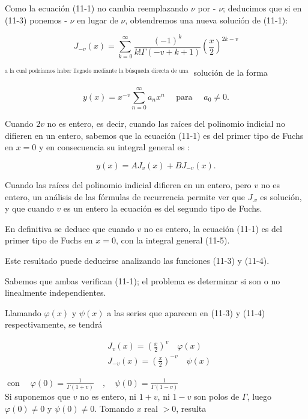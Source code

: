 \documentclass[10pt]{article}
\theoremstyle{plain}
\theoremstyle{definition}
\theoremstyle{remark}
\begin{document}
Como la ecuación (11-1) no cambia reemplazando $\nu$ por - $\nu$; deducimos que si en (11-3) ponemos - $\nu$ en lugar de $\nu$, obtendremos una nueva solución de (11-1):


\begin{equation*}
J_{-v}(x)=\sum_{k=0}^{\infty} \frac{(-1)^{k}}{k!\Gamma(-v+k+1)}\left(\frac{x}{2}\right)^{2 k-v} \tag{11-4}
\end{equation*}


${ }^{\text {a la cual podríamos haber llegado mediante la búsqueda directa de una }}$ solución de la forma

$$
y(x)=x^{-v} \sum_{n=0}^{\infty} a_{n} x^{n} \quad \text { para } \quad a_{0} \neq 0 .
$$

Cuando $2 v$ no es entero, es decir, cuando las raíces del polinomio indicial no difieren en un entero, sabemos que la ecuación (11-1) es del primer tipo de Fuchs en $x=0$ y en consecuencia su integral general es :


\begin{equation*}
y(x)=A J_{v}(x)+B J_{-v}(x) . \tag{11-5}
\end{equation*}


Cuando las raíces del polinomio indicial difieren en un entero, pero $v$ no es entero, un análisis de las fórmulas de recurrencia permite ver que $J_{. v}$ es solución, y que cuando $v$ es un entero la ecuación es del segundo tipo de Fuchs.

En definitiva se deduce que cuando $v$ no es entero, la ecuación (11-1) es del primer tipo de Fuchs en $x=0$, con la integral general (11-5).

Este resultado puede deducirse analizando las funciones (11-3) y (11-4).

Sabemos que ambas verifican (11-1); el problema es determinar si son o no linealmente independientes.

Llamando $\varphi(x)$ y $\psi(x)$ a las series que aparecen en (11-3) y (11-4) respectivamente, se tendrá

$$
\begin{aligned}
& J_{v}(x)=\left(\frac{x}{2}\right)^{v} \quad \varphi(x) \\
& J_{-v}(x)=\left(\frac{x}{2}\right)^{-v} \quad \psi(x)
\end{aligned}
$$

$\operatorname{con} \quad \varphi(0)=\frac{1}{\Gamma(1+v)} \quad, \quad \psi(0)=\frac{1}{\Gamma(1-v)}$\\
Si suponemos que $v$ no es entero, ni $1+v$, ni $1-v$ son polos de $\Gamma$, luego $\varphi(0) \neq 0$ y $\psi(0) \neq 0$. Tomando $x$ real $>0$, resulta
\end{document}
